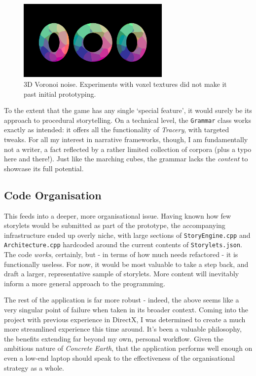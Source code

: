 \documentclass[a4paper, 11pt]{article}
\begin{document}
\begin{flushleft}
\vspace{5pt}\noindent
\begin{figure}[h]
\centering
\includegraphics[width=0.66\textwidth]{Euclidean Voronoi Voxel}
\caption{3D Voronoi noise. Experiments with voxel textures did not make it past initial prototyping.}
\label{Euclidean Voronoi Voxel}
\end{figure}

\vspace{5pt}\noindent
To the extent that the game has any single `special feature',  it would surely be its approach to procedural storytelling. On a technical level, the \texttt{Grammar} class works exactly as intended: it offers all the functionality of \textit{Tracery}, with targeted tweaks. For all my interest in narrative frameworks, though, I am fundamentally not a writer, a fact reflected by a rather limited collection of corpora (plus a typo here and there!). Just like the marching cubes, the grammar lacks the \textit{content} to showcase its full potential. 

\subsection{Code Organisation}

This feeds into a deeper, more organisational issue. Having known how few storylets would be submitted as part of the prototype, the accompanying infrastructure ended up overly niche, with large sections of \texttt{StoryEngine.cpp} and \texttt{Architecture.cpp} hardcoded around the current contents of \texttt{Storylets.json}. The code \textit{works}, certainly, but - in terms of how much needs refactored - it is functionally useless. For now, it would be most valuable to take a step back, and draft a larger, representative sample of storylets. More content will inevitably inform a more general approach to the programming.

\vspace{5pt}\noindent
The rest of the application is far more robust - indeed, the above seems like a very singular point of failure when taken in its broader context. Coming into the project with previous experience in DirectX, I was determined to create a much more streamlined experience this time around. It's been a valuable philosophy, the benefits extending far beyond my own, personal workflow. Given the ambitious nature of \textit{Concrete Earth}, that the application performs well enough on even a low-end laptop should speak to the effectiveness of the organisational strategy as a whole.


\end{flushleft}
\end{document}
